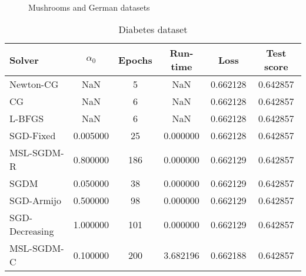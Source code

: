 \begin{figure}
\centering
 \\
\caption[]{Mushrooms and German datasets}
\label{fig:mush-german}
\end{figure}


\begin{table}
\centering
\caption{Diabetes dataset}
\label{tab:diab-table}
\begin{tabular}{lS[round-precision=3]S[drop-zero-decimal]S[round-precision=4]S[round-precision=6]S[round-precision=4]}
\toprule
Solver & {$\alpha_0$} & {Epochs} & {Run-time} & {Loss} & {Test score} \\
\midrule
Newton-CG & NaN & 5 & NaN & 0.662128 & 0.642857 \\
CG & NaN & 6 & NaN & 0.662128 & 0.642857 \\
L-BFGS & NaN & 6 & NaN & 0.662128 & 0.642857 \\
SGD-Fixed & 0.005000 & 25 & 0.000000 & 0.662128 & 0.642857 \\
MSL-SGDM-R & 0.800000 & 186 & 0.000000 & 0.662129 & 0.642857 \\
SGDM & 0.050000 & 38 & 0.000000 & 0.662129 & 0.642857 \\
SGD-Armijo & 0.500000 & 98 & 0.000000 & 0.662129 & 0.642857 \\
SGD-Decreasing & 1.000000 & 101 & 0.000000 & 0.662129 & 0.642857 \\
MSL-SGDM-C & 0.100000 & 200 & 3.682196 & 0.662188 & 0.642857 \\
\bottomrule
\end{tabular}
\end{table}

